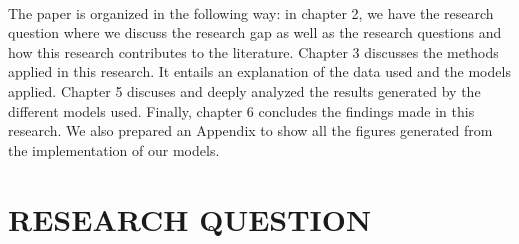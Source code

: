 \documentclass[12pt,italian, twoside]{report}
\begin{document}
\\
The paper is organized in the following way: in chapter 2, we have the research question where we discuss the research gap as well as the research questions and how this research contributes to the literature. Chapter 3 discusses the methods applied in this research. It entails an explanation of the data used and the models applied. Chapter 5 discuses and deeply analyzed the results generated by the different models used. Finally, chapter 6 concludes the findings made in this research. We also prepared an Appendix to show all the figures generated from the implementation of our models.




% 
% 

\chapter{RESEARCH QUESTION}
\label{chap:stato_arte}
\end{document}
